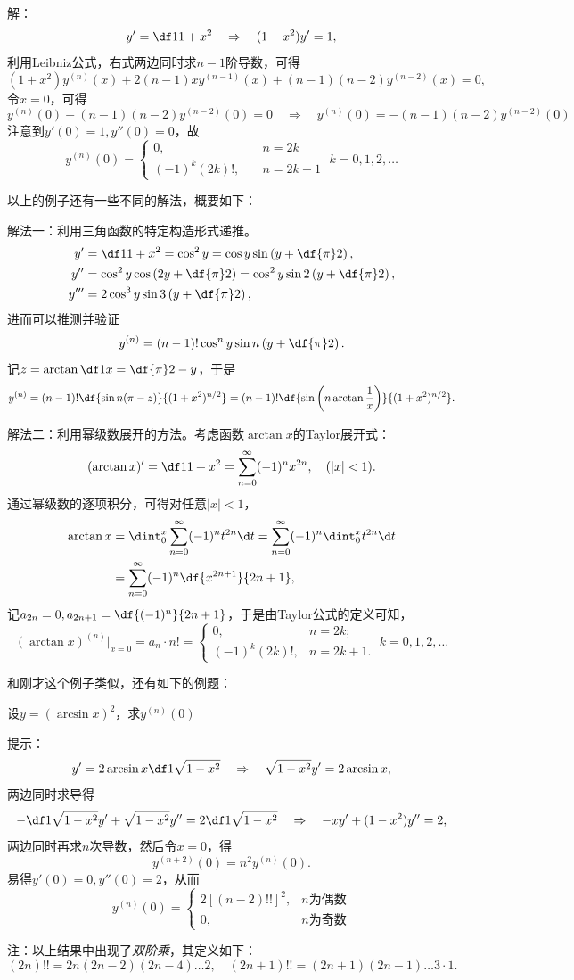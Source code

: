 解：
$$y'=\df1{1+x^2}\quad \Rightarrow\quad (1+x^2)y'=1,$$
利用Leibniz公式，右式两边同时求$n-1$阶导数，可得
$$(1+x^2)y^{(n)}(x)+2(n-1)xy^{(n-1)}(x)+(n-1)(n-2)y^{(n-2)}(x)=0,$$
令$x=0$，可得
$$y^{(n)}(0)+(n-1)(n-2)y^{(n-2)}(0)=0\quad
\Rightarrow\quad y^{(n)}(0)=-(n-1)(n-2)y^{(n-2)}(0)$$
注意到$y'(0)=1,y''(0)=0$，故
$$y^{(n)}(0)=\left\{\begin{array}{ll}
0,\quad& n=2k\\
(-1)^k(2k)!,\quad& n=2k+1
\end{array}\right.\;k=0,1,2,\ldots$$
\fin

\begin{shaded}
以上的例子还有一些不同的解法，概要如下：

解法一：利用三角函数的特定构造形式递推。
\begin{align*}
	y'&=\df1{1+x^2}=\cos^2y=\cos y\sin\left(y+\df{\pi}2\right),\\
	y''&=\cos^2y\cos\left(2y+\df{\pi}2\right)
	=\cos^2y\sin2\left(y+\df{\pi}2\right),\\
	y'''&=2\cos^3y\sin3\left(y+\df{\pi}2\right),
\end{align*}
进而可以推测并验证
$$y^{(n)}=(n-1)!\cos^ny\sin n\left(y+\df{\pi}2\right).$$
记$z=\arctan\df1x=\df{\pi}2-y$，于是
$$y^{(n)}=(n-1)!\df{\sin n(\pi-z)}{(1+x^2)^{n/2}}=
(n-1)!\df{\sin\left(n\arctan\frac1x\right)}{(1+x^2)^{n/2}}.$$

解法二：利用幂级数展开的方法。考虑函数$\arctan x$的Taylor展开式：
$$(\arctan x)'=\df1{1+x^2}=\sum\limits_{n=0}^{\infty}(-1)^nx^{2n},
\quad (|x|<1).$$ 
通过幂级数的逐项积分，可得对任意$|x|<1$，
\begin{align*}
	\arctan x&=\dint_0^x\sum\limits_{n=0}^{\infty}(-1)^nt^{2n}\d t
	=\sum\limits_{n=0}^{\infty}(-1)^n\dint_0^xt^{2n}\d t\\
	&=\sum\limits_{n=0}^{\infty}(-1)^n\df{x^{2n+1}}{2n+1},
\end{align*}
记$a_{2n}=0,a_{2n+1}=\df{(-1)^n}{2n+1}$，于是由Taylor公式的定义可知，
$$(\arctan x)^{(n)}|_{x=0}=a_n\cdot n!
=\left\{\begin{array}{ll}
	0,& n=2k;\\ (-1)^k(2k)!, & n=2k+1.
\end{array}\right.\;k=0,1,2,\ldots$$

和刚才这个例子类似，还有如下的例题：

\egz 设$y=(\arcsin x)^2$，求$y^{(n)}(0)$

提示：
$$y'=2\arcsin x\df1{\sqrt{1-x^2}}\quad
\Rightarrow\quad \sqrt{1-x^2}y'=2\arcsin x,$$
两边同时求导得
$$-\df1{\sqrt{1-x^2}}y'+\sqrt{1-x^2}y''=2\df1{\sqrt{1-x^2}}\quad
\Rightarrow\quad-xy'+(1-x^2)y''=2,$$
两边同时再求$n$次导数，然后令$x=0$，得
$$y^{(n+2)}(0)=n^2y^{(n)}(0).$$
易得$y'(0)=0,y''(0)=2$，从而
$$y^{(n)}(0)=\left\{\begin{array}{ll}
2[(n-2)!!]^2,& n\mbox{为偶数}\\
0,& n\mbox{为奇数}
\end{array}\right.$$

注：以上结果中出现了{\it 双阶乘}，其定义如下：
$$(2n)!!=2n(2n-2)(2n-4)\ldots2,
\quad (2n+1)!!=(2n+1)(2n-1)\ldots3\cdot1.$$
\end{shaded}

